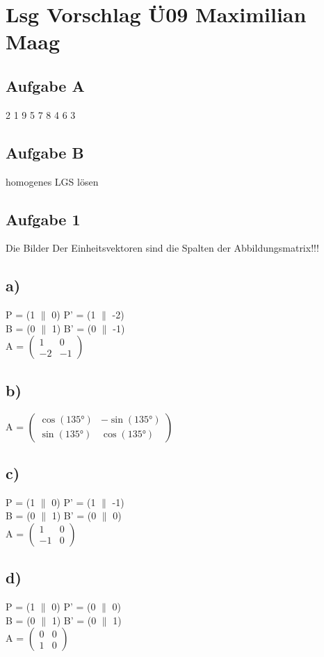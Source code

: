 \documentclass{article}
\begin{document}
	\section*{Lsg Vorschlag Ü09 Maximilian Maag}
	\subsection*{Aufgabe A}
	2 1 9 5 7 8 4 6 3
	\subsection*{Aufgabe B}
	 homogenes LGS lösen
	 \subsection*{Aufgabe 1}
	 Die Bilder Der Einheitsvektoren sind die Spalten der Abbildungsmatrix!!!
	 \subsection*{a)}
	 P = (1 $\|$ 0) P' = (1 $\|$ -2) \\
	 B = (0 $\|$ 1) B' = (0 $\|$ -1) \\
	 A = 
	 $\left(
	 \begin{array}{cc}
	 1 & 0\\ -2 &-1 
	 \end{array}
	 \right)$
	 \subsection*{b)}
	 A = 
	 $\left(
	 \begin{array}{cc}
		\cos(135°)& -\sin(135°) \\ \sin(135°) & \cos(135°) 
	 \end{array}
	 \right)$
	 \subsection*{c)}
	 P = (1 $\|$ 0) P' = (1 $\|$ -1) \\
	 B = (0 $\|$ 1) B' = (0  $\|$ 0) \\
	 A =
	 $\left(
	 \begin{array}{cc}
	 1 & 0\\ -1&0
	 \end{array}
	 \right)$
	 \subsection*{d)}
	 P = (1 $\|$ 0) P' = (0 $\|$ 0) \\
	 B = (0 $\|$ 1) B' = (0  $\|$ 1) \\
	 A =
	 $\left(
	 \begin{array}{cc}
	 0 & 0\\ 1&0
	 \end{array}
	 \right)$
\end{document}
